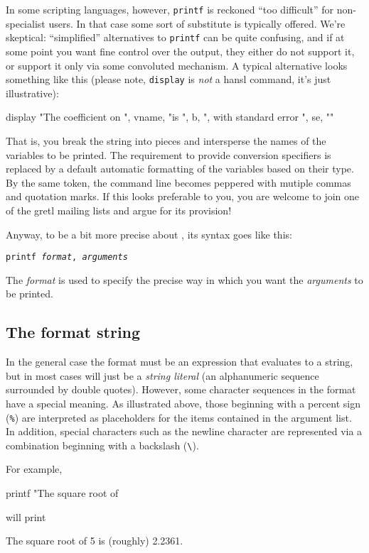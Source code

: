 In some scripting languages, however, \texttt{printf} is reckoned
``too difficult'' for non-specialist users. In that case some sort of
substitute is typically offered. We're skeptical: ``simplified''
alternatives to \texttt{printf} can be quite confusing, and if at some
point you want fine control over the output, they either do not
support it, or support it only via some convoluted mechanism. A
typical alternative looks something like this (please note,
\texttt{display} is \textit{not} a hansl command, it's just
illustrative):
\begin{code}
display "The coefficient on ", vname, "is ", b, ", with standard error ", se, "\n"
\end{code}
That is, you break the string into pieces and intersperse the names of
the variables to be printed. The requirement to provide conversion
specifiers is replaced by a default automatic formatting of the
variables based on their type. By the same token, the command line
becomes peppered with mutiple commas and quotation marks. If this looks
preferable to you, you are welcome to join one of the gretl mailing
lists and argue for its provision!

Anyway, to be a bit more precise about , its syntax goes
like this:
\begin{flushleft}
  \texttt{printf \emph{format}, \emph{arguments}}
\end{flushleft}
The \emph{format} is used to specify the precise way in which you want
the \emph{arguments} to be printed.

\subsection{The format string}
\label{sec:fmtstring}

In the general case the  format must be an expression that
evaluates to a string, but in most cases will just be a \textit{string
  literal} (an alphanumeric sequence surrounded by double
quotes). However, some character sequences in the format have a
special meaning. As illustrated above, those beginning with a
percent sign (\texttt{\%}) are interpreted as placeholders for the
items contained in the argument list. In addition, special characters
such as the newline character are represented via a combination
beginning with a backslash (\verb|\|).

For example,
\begin{code}
printf "The square root of %
\end{code}
will print 
\begin{code}
The square root of 5 is (roughly) 2.2361.
\end{code}

